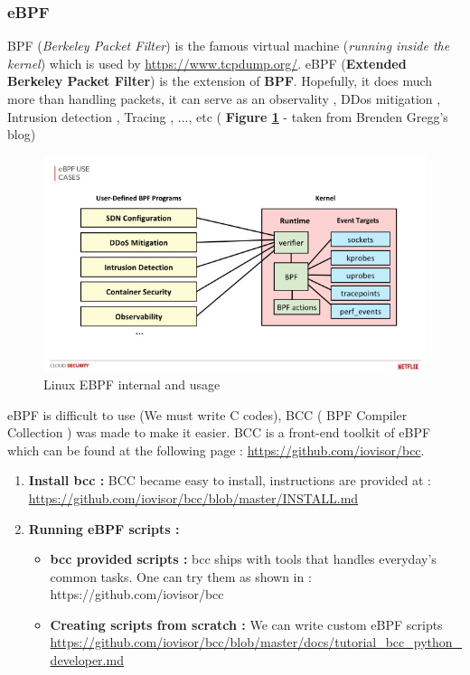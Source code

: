 \subsubsection{eBPF}
BPF (\textit{Berkeley Packet Filter}) is the famous virtual machine (\textit{running inside the kernel}) which is used by {\color{blue}\url{https://www.tcpdump.org/}}.
eBPF (\textbf{Extended Berkeley Packet Filter}) is the extension of \textbf{BPF}. Hopefully, it does much more than handling packets, it can serve as an observality , DDos mitigation , Intrusion detection , Tracing , ..., etc ( \textbf{Figure \ref{Linux EBPF internal and usage}} - taken from Brenden Gregg's blog)
					\begin{figure}[H]
						\centering
        				\includegraphics[scale=0.4]{img/solution/security-monitoring-with-ebpf-11-638.jpg}
        				\caption{Linux EBPF internal and usage}
        				\label{Linux EBPF internal and usage}
    				\end{figure}	

eBPF is difficult to use (We must write C codes), BCC ( BPF Compiler Collection ) was made to make it easier.
BCC is a front-end toolkit of eBPF which can be found at the following page : {\color{blue}\url{https://github.com/iovisor/bcc}}.


\begin{enumerate}
	\item \textbf{Install bcc : } BCC became easy to install, instructions are provided at : {\color{blue}\url{https://github.com/iovisor/bcc/blob/master/INSTALL.md}}
	
	\item \textbf{Running eBPF scripts : } 
		\begin{itemize}
			\item \textbf{bcc provided scripts : } bcc ships with tools that handles everyday's common tasks. One can try them as shown in : {\color{blue}https://github.com/iovisor/bcc}
			
			\item \textbf{Creating scripts from scratch : } We can write custom eBPF scripts {\color{blue}\url{https://github.com/iovisor/bcc/blob/master/docs/tutorial_bcc_python_developer.md}}
						
			
		\end{itemize}			
\end{enumerate}

